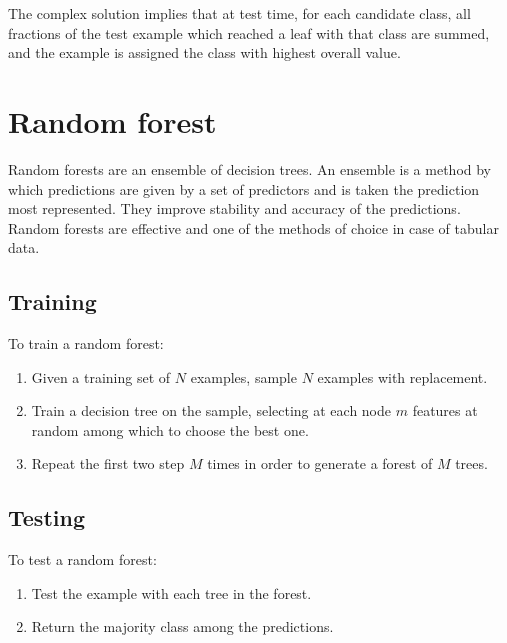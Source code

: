 	The complex solution implies that at test time, for each candidate class, all fractions of the test example which reached a leaf with that class are summed, and the example is assigned the class with highest overall value.

\section{Random forest}
Random forests are an ensemble of decision trees.
An ensemble is a method by which predictions are given by a set of predictors and is taken the prediction most represented.
They improve stability and accuracy of the predictions.
Random forests are effective and one of the methods of choice in case of tabular data.

	\subsection{Training}
	To train a random forest:

	\begin{multicols}{2}
		\begin{enumerate}
			\item Given a training set of $N$ examples, sample $N$ examples with replacement.
			\item Train a decision tree on the sample, selecting at each node $m$ features at random among which to choose the best one.
			\item Repeat the first two step $M$ times in order to generate a forest of $M$ trees.
		\end{enumerate}
	\end{multicols}

	\subsection{Testing}
	To test a random forest:

	\begin{multicols}{2}
		\begin{enumerate}
			\item Test the example with each tree in the forest.
			\item Return the majority class among the predictions.
		\end{enumerate}
	\end{multicols}
